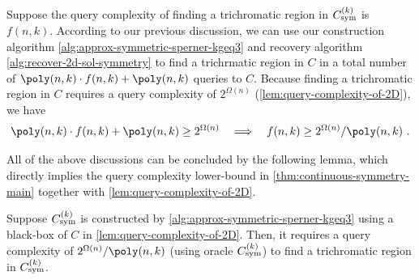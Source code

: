 Suppose the query complexity of finding a trichromatic region in $C_{\rm sym}^{(k)}$ is $f(n,k)$.
According to our previous discussion, we can use our construction algorithm \cref{alg:approx-symmetric-sperner-kgeq3} and recovery algorithm \cref{alg:recover-2d-sol-symmetry} to find a trichrmatic region in $C$ in a total number of $\poly(n,k)\cdot f(n,k) + \poly(n,k)$ queries to $C$. 
Because finding a trichromatic region in $C$ requires a query complexity of $2^{\Omega(n)}$ (\cref{lem:query-complexity-of-2D}), we have 
\begin{align*}
    \poly(n,k)\cdot f(n,k) + \poly(n,k) \geq 2^{\Omega(n)} \quad \Longrightarrow \quad f(n,k)  \geq 2^{\Omega(n)}/\poly(n,k)~.
\end{align*}

All of the above discussions can be concluded by the following lemma, which directly implies the query complexity lower-bound in \cref{thm:continuous-symmetry-main} together with \cref{lem:query-complexity-of-2D}. 

\begin{lemma}
    \label{lem:query-complexity-of-approx-kD}
    Suppose $C_{\rm sym}^{(k)}$ is constructed by \cref{alg:approx-symmetric-sperner-kgeq3} using a black-box of $C$ in \cref{lem:query-complexity-of-2D}.
    Then, it requires a query complexity of $2^{\Omega(n)}/\poly(n,k)$ (using oracle $C_{\rm sym}^{(k)}$) to find a trichromatic region in $C_{\rm sym}^{(k)}$. 
\end{lemma}